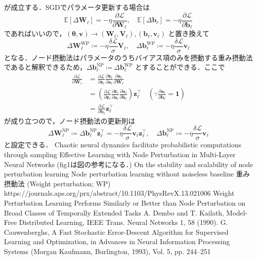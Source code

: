 が成立する．SGDでパラメータ更新する場合は
\begin{equation}
\mathbb{E}[\Delta \mathbf{W}_\ell]=-\eta \dfrac{\partial \mathcal{L}}{\partial \mathbf{W}_\ell},\quad \mathbb{E}[\Delta \mathbf{b}_\ell]=-\eta \dfrac{\partial \mathcal{L}}{\partial \mathbf{b}_\ell}
\end{equation}
であればいいので，$(\boldsymbol{\theta}, \mathbf{v}) \to (\mathbf{W}_\ell, \mathbf{V}_\ell), (\mathbf{b}_\ell, \mathbf{v}_\ell)$ と置き換えて
\begin{equation}
\Delta \mathbf{W}_\ell^{\mathrm{WP}}\coloneqq -\eta \frac{\delta \mathcal{L}}{\sigma}\mathbf{V}_\ell,\quad \Delta \mathbf{b}_\ell^{\mathrm{WP}}\coloneqq -\eta \frac{\delta \mathcal{L}}{\sigma}\mathbf{v}_\ell
\end{equation}
となる．ノード摂動法はパラメータのうちバイアス項のみを摂動する重み摂動法であると解釈できるため，$\Delta \mathbf{b}_\ell^{\mathrm{NP}}\coloneqq \Delta \mathbf{b}_\ell^{\mathrm{WP}}$ とすることができる．ここで
\begin{align}
\frac{\partial \mathcal{L}}{\partial \mathbf{W}_\ell}&=\frac{\partial \mathcal{L}}{\partial \mathbf{z}_\ell} \frac{\partial \mathbf{z}_\ell}{\partial \mathbf{a}_\ell} \frac{\partial \mathbf{a}_\ell}{\partial \mathbf{W}_\ell}\\
&=\left(\frac{\partial \mathcal{L}}{\partial \mathbf{z}_\ell} \frac{\partial \mathbf{z}_\ell}{\partial \mathbf{a}_\ell}\frac{\partial \mathbf{a}_\ell}{\partial \mathbf{b}_\ell}\right) \mathbf{z}_\ell^\top\quad \left(\because \frac{\partial \mathbf{a}_\ell}{\partial \mathbf{b}_\ell}=\mathbf{1}\right)\\
&=\frac{\partial \mathcal{L}}{\partial \mathbf{b}_\ell}\mathbf{z}_\ell^\top
\end{align}
が成り立つので，ノード摂動法の更新則は
\begin{equation}
\Delta \mathbf{W}_\ell^{\mathrm{NP}}\coloneqq \Delta \mathbf{b}_\ell^{\mathrm{NP}}\mathbf{z}_\ell^\top=-\eta \frac{\delta \mathcal{L}}{\sigma}\mathbf{v}_\ell\mathbf{z}_\ell^\top,\quad \Delta \mathbf{b}_\ell^{\mathrm{NP}}\coloneqq -\eta \frac{\delta \mathcal{L}}{\sigma}\mathbf{v}_\ell
\end{equation}
と設定できる．
Chaotic neural dynamics facilitate probabilistic computations through sampling
Effective Learning with Node Perturbation in Multi-Layer Neural Networks (fig1は図の参考になる．)
On the stability and scalability of node perturbation learning
Node perturbation learning without noiseless baseline
重み摂動法 (Weight perturbation; WP)
https://journals.aps.org/prx/abstract/10.1103/PhysRevX.13.021006
Weight Perturbation Learning Performs Similarly or Better than Node Perturbation on Broad Classes of Temporally Extended Tasks
A. Dembo and T. Kailath, Model-Free Distributed Learning, IEEE Trans. Neural Networks 1, 58 (1990).
G. Cauwenberghs, A Fast Stochastic Error-Descent Algorithm for Supervised Learning and Optimization, in Advances in Neural Information Processing Systems (Morgan Kaufmann, Burlington, 1993), Vol. 5, pp. 244–251
